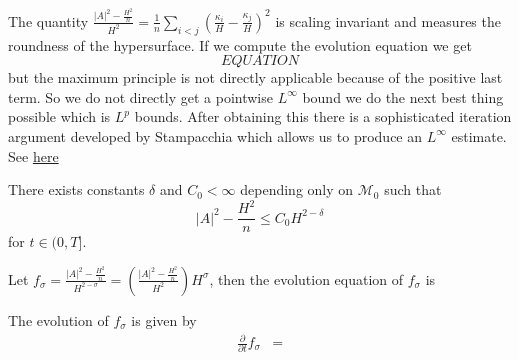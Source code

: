 The quantity $ \frac{|A|^{2} - \frac{H^{2}}{n}}{H^{2}} = \frac{1}{n} \sum_{i<j}^{} \left( \frac{\kappa_{i}}{H}- \frac{\kappa_{j}}{H} \right)^{2}  $ is scaling invariant and measures the roundness of the hypersurface. If we compute the evolution equation we get \begin{equation}
EQUATION
\end{equation} 
but the maximum principle is not directly applicable because of the positive last term. So we do not directly get a pointwise $ L^{\infty} $ bound we do the next best thing possible which is $ L^{p} $ bounds. After obtaining this there is a sophisticated iteration argument developed by Stampacchia which allows us to produce an $ L^{\infty} $ estimate. See  \href{https://youtu.be/a577KPiOoxw?t=1790}{here}
\begin{thm}
There exists constants $ \delta $ and $ C_{0} < \infty $ depending only on $ \mathcal{M}_{0} $ such that 
\[ |A|^{2} - \frac{H^{2}}{n} \le C_{0}H^{2-\delta} \]
for $ t \in (0, T] $.

\end{thm}
Let $ f_{\sigma} = \frac{|A|^{2}- \frac{H^{2}}{n}}{H^{2-\sigma}} = \left(\frac{|A|^{2} - \frac{H^{2}}{n}}{H^{2}}\right)H^{\sigma}$, then the evolution equation of $ f_{\sigma} $ is 
\begin{lemma}
The evolution of $ f_{\sigma} $ is given by \begin{align*}
    \frac{ \partial}{ \partial t}f_{\sigma} & = 
\end{align*}
\end{lemma}
\begin{comment}
    (Huisken's remark on this from the lecture series: the bad term can only be controlled using integral estimates \href{https://www.mfo.de/about-the-institute/staff/prof-dr-gerhard-huisken/lectures/mean-curvature-flow/lecture-3}{58 min mark} )

(Sinestrari intuition about Stampacchia iteration : \href{https://youtu.be/XvUGowx9WNo?t=2119}{yt link})
\end{comment}
